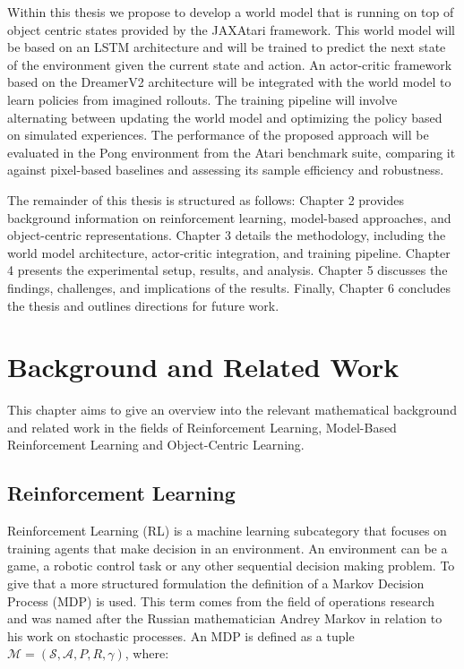 \documentclass[
	english,
	ruledheaders=section,
	class=report,
	thesis={type=master},
	accentcolor=9c,
	custommargins=true,
	marginpar=false,
	parskip=half-,
	fontsize=11pt,
]{tudapub}
\begin{document}
Within this thesis we propose to develop a world model that is running on top
of object centric states provided by the JAXAtari framework. This world model
will be based on an LSTM architecture and will be trained to predict the next
state of the environment given the current state and action. An actor-critic
framework based on the DreamerV2 architecture will be integrated with the world
model to learn policies from imagined rollouts. The training pipeline will
involve alternating between updating the world model and optimizing the policy
based on simulated experiences. The performance of the proposed approach will
be evaluated in the Pong environment from the Atari benchmark suite, comparing
it against pixel-based baselines and assessing its sample efficiency and
robustness.

The remainder of this thesis is structured as follows: Chapter 2 provides
background information on reinforcement learning, model-based approaches, and
object-centric representations. Chapter 3 details the methodology, including
the world model architecture, actor-critic integration, and training pipeline.
Chapter 4 presents the experimental setup, results, and analysis. Chapter 5
discusses the findings, challenges, and implications of the results. Finally,
Chapter 6 concludes the thesis and outlines directions for future work.

\chapter{Background and Related Work}
\label{chap:background}
This chapter aims to give an overview into the relevant mathematical background and related work
in the fields of Reinforcement Learning, Model-Based Reinforcement Learning and Object-Centric Learning.
\section{Reinforcement Learning}
\label{sec:reinforcement_learning}

Reinforcement Learning (RL) is a machine learning subcategory that focuses on
training agents that make decision in an environment. An environment can be a
game, a robotic control task or any other sequential decision making problem.
To give that a more structured formulation the definition of a Markov Decision
Process (MDP) is used. This term comes from the field of operations research
and was named after the Russian mathematician Andrey Markov in relation to his
work on stochastic processes. An MDP is defined as a tuple $\mathcal{M} =
	(\mathcal{S}, \mathcal{A}, P, R, \gamma)$, where:
\end{document}
